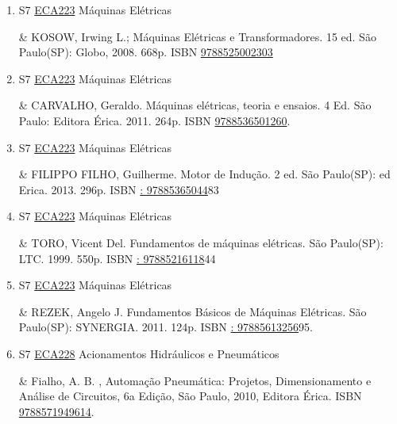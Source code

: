 \documentclass[12pt,a4paper]{book}
\begin{document}
\begin{enumerate}
 

 \item S7 \hyperref[PUD:ECA223]{ECA223} Máquinas Elétricas

& KOSOW, Irwing L.;  Máquinas Elétricas e Transformadores.  15 ed.  São Paulo(SP): Globo, 2008.  668p.  ISBN \href{http://www.bn.br/site/pages/servicosProfissionais/agenciaISBN/isbnBusca/FbnBuscaISBNCatalogo.asp?pField=ISBN&pIntPagina=1&pISBN=25002303&nidbISBN=true&hidbISBN=true}{9788525002303}

 

 \item S7 \hyperref[PUD:ECA223]{ECA223} Máquinas Elétricas

& CARVALHO, Geraldo.  Máquinas elétricas, teoria e ensaios.  4 Ed.  São Paulo: Editora Érica.  2011.  264p.  ISBN \href{http://www.bn.br/site/pages/servicosProfissionais/agenciaISBN/isbnBusca/FbnBuscaISBNCatalogo.asp?pField=ISBN&pIntPagina=1&pISBN=36501260&nidbISBN=true&hidbISBN=true}{9788536501260}.
 \item S7 \hyperref[PUD:ECA223]{ECA223} Máquinas Elétricas

& FILIPPO FILHO, Guilherme.  Motor de Indução.  2 ed.  São Paulo(SP): ed Erica.  2013.  296p.  ISBN \href{http://www.google.com/search?hl=pt-BR&tbo=p&tbm=bks&q=isbn:: 97885365044&num=10}{: 97885365044}83
 

 \item S7 \hyperref[PUD:ECA223]{ECA223} Máquinas Elétricas

& TORO, Vicent Del.  Fundamentos de máquinas elétricas.  São Paulo(SP): LTC.  1999.  550p.  ISBN \href{http://www.google.com/search?hl=pt-BR&tbo=p&tbm=bks&q=isbn:: 97885216118&num=10}{: 97885216118}44
 

 \item S7 \hyperref[PUD:ECA223]{ECA223} Máquinas Elétricas

& REZEK, Angelo J.  Fundamentos Básicos de Máquinas Elétricas.  São Paulo(SP): SYNERGIA.  2011.  124p.  ISBN \href{http://www.google.com/search?hl=pt-BR&tbo=p&tbm=bks&q=isbn:: 97885613256&num=10}{: 97885613256}95.
 \item S7 \hyperref[PUD:ECA228]{ECA228} Acionamentos Hidráulicos e Pneumáticos

&  Fialho, A.  B. , Automação Pneumática: Projetos, Dimensionamento e Análise de Circuitos, 6a Edição, São Paulo, 2010, Editora Érica.  ISBN \href{http://www.bn.br/site/pages/servicosProfissionais/agenciaISBN/isbnBusca/FbnBuscaISBNCatalogo.asp?pField=ISBN&pIntPagina=1&pISBN=71949614&nidbISBN=true&hidbISBN=true}{9788571949614}. 


\end{enumerate}
\end{document}
